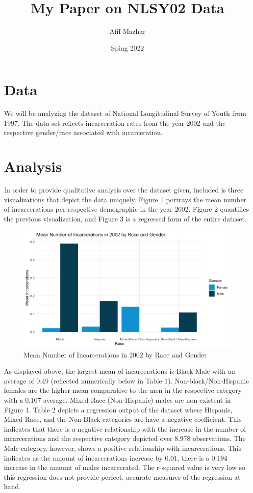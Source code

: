 \documentclass{article}
\author{Afif Mazhar}
\title{My Paper on NLSY02 Data}
\date{Sping 2022}
\begin{document}
\maketitle

\section{Data}

We will be analyzing the dataset of National Longitudinal Survey of Youth from 1997. The data set reflects incarceration rates from the year 2002 and the respective gender/race associated with incarceration.
\newpage

\section{Analysis}

In order to provide qualitative analysis over the dataset given, included is three visualizations that depict the data uniquely. Figure 1 portrays the mean number of incarcerations per respective demographic in the year 2002. Figure 2 quantifies the previous visualization, and Figure 3 is a regressed form of the entire dataset.


\begin{figure}[H]
    \begin{center}
        \includegraphics[width=.85\textwidth]{incarcerations_by_racegender}
    \end{center}
    \caption{Mean Number of Incarcerations in 2002 by Race and Gender}
    \label{fig:graph}
\end{figure}


As displayed above, the largest mean of incarcerations is Black Male with an average of 0.49 (reflected numerically below in Table 1). Non-black/Non-Hispanic females are the higher mean comparative to the men in the respective category with a 0.107 average. Mixed Race (Non-Hispanic) males are non-existent in Figure 1. Table 2 depicts a regression output of the dataset where Hispanic, Mixed Race, and the Non-Black categories are have a negative coefficient. This indicates that there is a negative relationship with the increase in the number of incarcerations and the respective category depicted over 8,978 observations. The Male category, however, shows a positive relationship with incarcerations. This indicates as the amount of incarcerations increase by 0.01, there is a 0.194 increase in the amount of males incarcerated. The r-squared value is very low so this regression does not provide perfect, accurate measures of the regression at hand.




\end{document}
